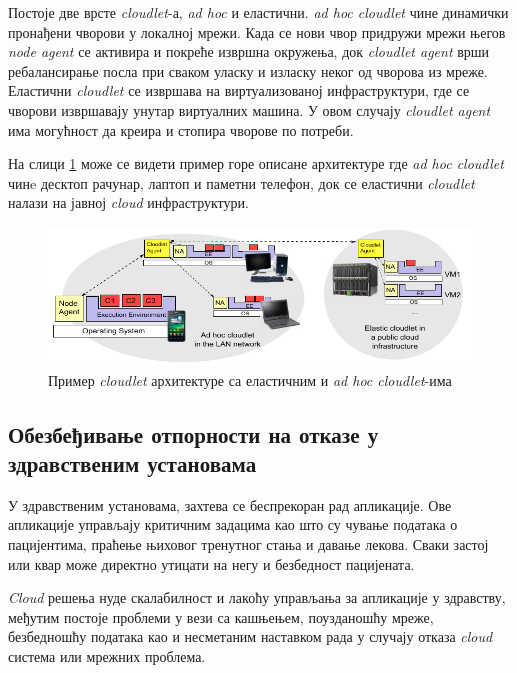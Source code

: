 Постоје две врсте \textit{cloudlet}-а, \textit{ad hoc} и еластични. \textit{ad hoc cloudlet} чине динамички пронађени чворови у локалној мрежи. Када се нови чвор придружи мрежи његов \textit{node agent} се активира и покреће извршна окружења, док \textit{cloudlet agent} врши ребалансирање посла при сваком уласку и изласку неког од чворова из мреже. Еластични \textit{cloudlet} се извршава на виртуализованој инфраструктури, где се чворови извршавају унутар виртуалних машина. У овом случају \textit{cloudlet agent} има могућност да креира и стопира чворове по потреби.

На слици \ref{fig:cloudlet_arch} може се видети пример горе описане архитектуре где \textit{ad hoc cloudlet} чинe десктоп рачунар, лаптоп и паметни телефон, док се еластични \textit{cloudlet} налази на јавној \textit{cloud} инфраструктури. 

\begin{figure}[H]
    \centering
    \includegraphics[width=1\textwidth]{images/cloudlet_arch.png}
    \caption{Пример \textit{cloudlet} архитектуре са еластичним и  \textit{ad hoc cloudlet}-има}
    \label{fig:cloudlet_arch}
\end{figure}

\pagebreak

\subsection{Обезбеђивање отпорности на отказе у здравственим установама}

У здравственим установама,  захтева се беспрекоран рад апликације. Ове апликације управљају критичним задацима као што су чување података о пацијентима, праћење њиховог тренутног стања и давање лекова. Сваки застој или квар може директно утицати на негу и безбедност пацијената.

\textit{Cloud} решења нуде скалабилност и лакоћу управљања за апликације у здравству, међутим постоје проблеми у вези са кашњењем, поузданошћу мреже, безбедношћу података као и несметаним наставком рада у случају отказа \textit{cloud} система или мрежних проблема. 


